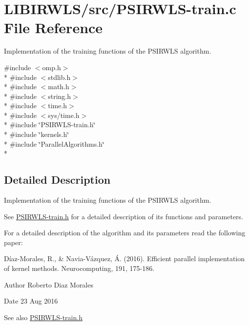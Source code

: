 \hypertarget{PSIRWLS-train_8c}{}\section{L\+I\+B\+I\+R\+W\+L\+S/src/\+P\+S\+I\+R\+W\+L\+S-\/train.c File Reference}
\label{PSIRWLS-train_8c}


Implementation of the training functions of the P\+S\+I\+R\+W\+LS algorithm.  


{\ttfamily \#include $<$omp.\+h$>$}\\*
{\ttfamily \#include $<$stdlib.\+h$>$}\\*
{\ttfamily \#include $<$math.\+h$>$}\\*
{\ttfamily \#include $<$string.\+h$>$}\\*
{\ttfamily \#include $<$time.\+h$>$}\\*
{\ttfamily \#include $<$sys/time.\+h$>$}\\*
{\ttfamily \#include \char`\"{}P\+S\+I\+R\+W\+L\+S-\/train.\+h\char`\"{}}\\*
{\ttfamily \#include \char`\"{}kernels.\+h\char`\"{}}\\*
{\ttfamily \#include \char`\"{}Parallel\+Algorithms.\+h\char`\"{}}\\*


\subsection{Detailed Description}
Implementation of the training functions of the P\+S\+I\+R\+W\+LS algorithm. 

See \hyperlink{PSIRWLS-train_8h}{P\+S\+I\+R\+W\+L\+S-\/train.\+h} for a detailed description of its functions and parameters.

For a detailed description of the algorithm and its parameters read the following paper\+:

Díaz-\/\+Morales, R., \& Navia-\/\+Vázquez, Á. (2016). Efficient parallel implementation of kernel methods. Neurocomputing, 191, 175-\/186.

\begin{DoxyAuthor}{Author}
Roberto Diaz Morales 
\end{DoxyAuthor}
\begin{DoxyDate}{Date}
23 Aug 2016 
\end{DoxyDate}
\begin{DoxySeeAlso}{See also}
\hyperlink{PSIRWLS-train_8h}{P\+S\+I\+R\+W\+L\+S-\/train.\+h} 
\end{DoxySeeAlso}
